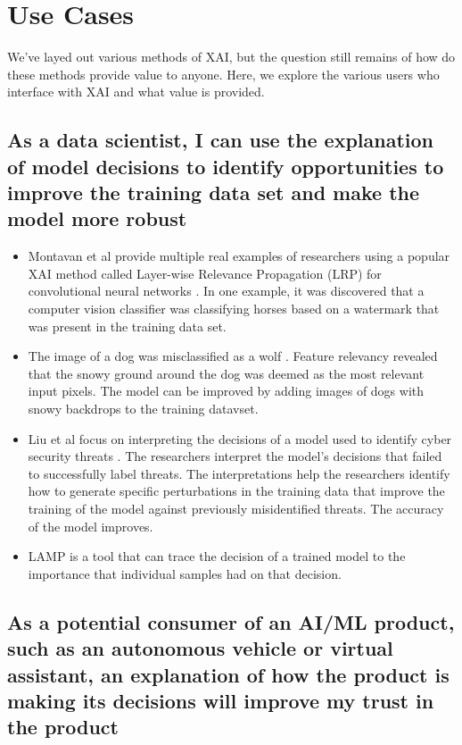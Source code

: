 \documentclass{IEEEtran}
\begin{document}
\section{Use Cases} \label{sec:UseCases}

We've layed out various methods of XAI, but the question still remains of how do these methods provide value to anyone.  Here, we explore the various users who interface with XAI and what value is provided.

\subsection{As a data scientist, I can use the explanation of model decisions to identify opportunities to improve the training data set and make the model more robust}

\begin{itemize}
    \item Montavan et al provide multiple real examples of researchers using a popular XAI method called Layer-wise Relevance Propagation (LRP) for convolutional neural networks \cite{MONTAVON20181}.  In one example, it was discovered that a computer vision classifier was classifying horses based on a watermark that was present in the training data set.
    \item The image of a dog was misclassified as a wolf \cite{Ribeiro:2016:WIT:2939672.2939778}.  Feature relevancy revealed that the snowy ground around the dog was deemed as the most relevant input pixels.  The model can be improved by adding images of dogs with snowy backdrops to the training datavset.
    \item Liu et al focus on interpreting the decisions of a model used to identify cyber security threats \cite{Liu:2018:ADM:3219819.3220027}.  The researchers interpret the model's decisions that failed to successfully label threats.  The interpretations help the researchers identify how to generate specific perturbations in the training data that improve the training of the model against previously misidentified threats.  The accuracy of the model improves.
    \item LAMP is a tool that can trace the decision of a trained model to the importance that individual samples had on that decision. \cite{Ma2017}
\end{itemize}

\subsection{As a potential consumer of an AI/ML product, such as an autonomous vehicle or virtual assistant, an explanation of how the product is making its decisions will improve my trust in the product}
\end{document}
